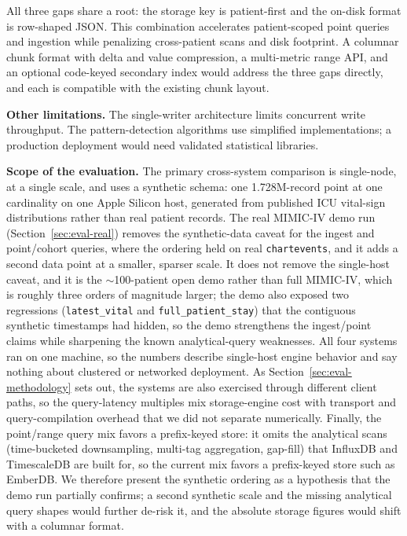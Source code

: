 \documentclass[journal]{IEEEtran}
\begin{document}
All three gaps share a root: the storage key is patient-first and the on-disk format is row-shaped JSON. This combination accelerates patient-scoped point queries and ingestion while penalizing cross-patient scans and disk footprint. A columnar chunk format with delta and value compression, a multi-metric range API, and an optional code-keyed secondary index would address the three gaps directly, and each is compatible with the existing chunk layout.

\textbf{Other limitations.}
The single-writer architecture limits concurrent write throughput. The pattern-detection algorithms use simplified implementations; a production deployment would need validated statistical libraries.

\textbf{Scope of the evaluation.}
The primary cross-system comparison is single-node, at a single scale, and uses a synthetic schema: one 1.728M-record point at one cardinality on one Apple Silicon host, generated from published ICU vital-sign distributions rather than real patient records. The real MIMIC-IV demo run (Section~\ref{sec:eval-real}) removes the synthetic-data caveat for the ingest and point/cohort queries, where the ordering held on real \texttt{chartevents}, and it adds a second data point at a smaller, sparser scale. It does not remove the single-host caveat, and it is the $\sim$100-patient open demo rather than full MIMIC-IV, which is roughly three orders of magnitude larger; the demo also exposed two regressions (\texttt{latest\_vital} and \texttt{full\_patient\_stay}) that the contiguous synthetic timestamps had hidden, so the demo strengthens the ingest/point claims while sharpening the known analytical-query weaknesses. All four systems ran on one machine, so the numbers describe single-host engine behavior and say nothing about clustered or networked deployment. As Section~\ref{sec:eval-methodology} sets out, the systems are also exercised through different client paths, so the query-latency multiples mix storage-engine cost with transport and query-compilation overhead that we did not separate numerically. Finally, the point/range query mix favors a prefix-keyed store: it omits the analytical scans (time-bucketed downsampling, multi-tag aggregation, gap-fill) that InfluxDB and TimescaleDB are built for, so the current mix favors a prefix-keyed store such as EmberDB. We therefore present the synthetic ordering as a hypothesis that the demo run partially confirms; a second synthetic scale and the missing analytical query shapes would further de-risk it, and the absolute storage figures would shift with a columnar format.
\end{document}
